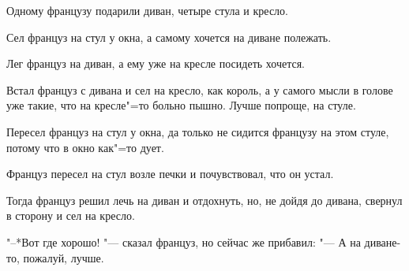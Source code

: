 
Одному  французу подарили диван,  четыре
стула и кресло.
    
Сел француз на стул у окна, а самому хочется на диване полежать.
    
Лег француз на диван, а ему уже на кресле посидеть хочется.
    
Встал француз с  дивана и сел на кресло,
как король, а у самого  мысли  в голове  уже
такие, что на кресле"=то больно пышно.  Лучше
попроще, на стуле.
    
Пересел француз на стул у окна, да только не сидится французу на 
этом стуле, потому что в окно как"=то дует.
    
Француз  пересел  на стул возле печки  и
почувствовал, что он устал.
    
Тогда  француз решил лечь на диван и отдохнуть,  но, не дойдя до дивана,  свернул в
сторону и сел на кресло.
     
"--*Вот где хорошо!  "--- сказал француз, но
сейчас же прибавил:  "--- А на диване-то, пожалуй, лучше.
